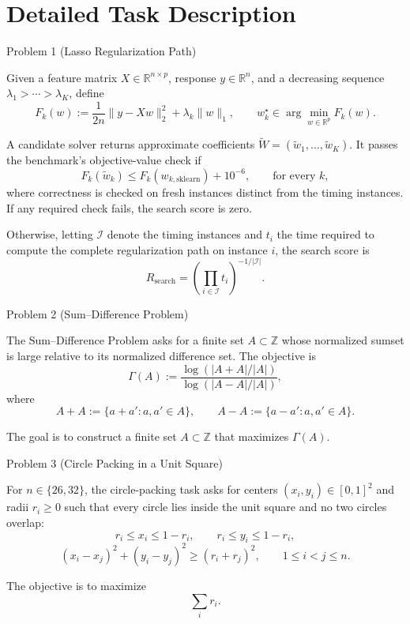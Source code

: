 \section{Detailed Task Description}
\begin{taskbox}{Problem 1 (Lasso Regularization Path)}
\small

Given a feature matrix
$X \in \mathbb{R}^{n \times p}$,
response $y \in \mathbb{R}^{n}$,
and a decreasing sequence
$\lambda_1 > \cdots > \lambda_K$,
define
\[
F_k(w)
:=
\frac{1}{2n}\|y-Xw\|_2^2
+
\lambda_k\|w\|_1,
\qquad
w_k^\star
\in
\arg\min_{w\in\mathbb{R}^p} F_k(w).
\]

A candidate solver returns approximate coefficients
$\widetilde{W}
=
(\widetilde{w}_1,\ldots,\widetilde{w}_K)$.
It passes the benchmark's objective-value check if
\[
F_k(\widetilde{w}_k)
\le
F_k(w_{k,\mathrm{sklearn}})
+
10^{-6},
\qquad
\text{for every } k,
\]
where correctness is checked on fresh instances distinct from the timing
instances. If any required check fails, the search score is zero.

Otherwise, letting $\mathcal{I}$ denote the timing instances and $t_i$ the
time required to compute the complete regularization path on instance $i$,
the search score is
\[
R_{\mathrm{search}}
=
\left(
\prod_{i\in\mathcal{I}} t_i
\right)^{-1/|\mathcal{I}|}.
\]

\end{taskbox}

\begin{taskbox}{Problem 2 (Sum--Difference Problem)}
\small

The Sum--Difference Problem asks for a finite set
$A \subset \mathbb{Z}$
whose normalized sumset is large relative to its normalized difference set.
The objective is
\[
\Gamma(A)
:=
\frac{
\log\!\left(|A+A|/|A|\right)
}{
\log\!\left(|A-A|/|A|\right)
},
\]
where
\[
A+A
:=
\{a+a' : a,a' \in A\},
\qquad
A-A
:=
\{a-a' : a,a' \in A\}.
\]

The goal is to construct a finite set $A \subset \mathbb{Z}$ that maximizes
$\Gamma(A)$.

\end{taskbox}


\begin{taskbox}{Problem 3 (Circle Packing in a Unit Square)}
\small

For $n \in \{26,32\}$, the circle-packing task asks for centers
$(x_i,y_i)\in[0,1]^2$
and radii $r_i\ge 0$ such that every circle lies inside the unit square
and no two circles overlap:
\[
r_i \le x_i \le 1-r_i,
\qquad
r_i \le y_i \le 1-r_i,
\]
\[
(x_i-x_j)^2+(y_i-y_j)^2
\ge
(r_i+r_j)^2,
\qquad
1\le i<j\le n.
\]

The objective is to maximize
\[
\sum_i r_i.
\]

\end{taskbox}


